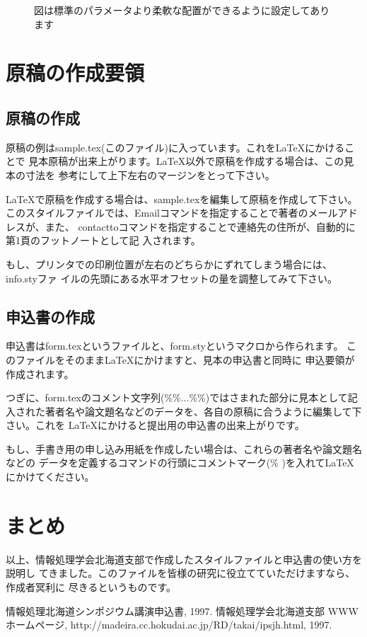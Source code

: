 \begin{figure}[h]
\vspace{6.5cm}
\caption{図は標準のパラメータより柔軟な配置ができるように設定してあります}
\label{f1}
\end{figure}

\section{原稿の作成要領}

\subsection{原稿の作成}
原稿の例はsample.tex(このファイル)に入っています。これを\LaTeX にかけることで
見本原稿が出来上がります。\LaTeX 以外で原稿を作成する場合は、この見本の寸法を
参考にして上下左右のマージンをとって下さい。

\LaTeX で原稿を作成する場合は、sample.texを編集して原稿を作成して下さい。
このスタイルファイルでは、Emailコマンドを指定することで著者のメールアドレスが、また、
contacttoコマンドを指定することで連絡先の住所が、自動的に第1頁のフットノートとして記
入されます。

もし、プリンタでの印刷位置が左右のどちらかにずれてしまう場合には、info.styファ
イルの先頭にある水平オフセットの量を調整してみて下さい。

\subsection{申込書の作成}
申込書はform.texというファイルと、form.styというマクロから作られます。
このファイルをそのまま\LaTeX にかけますと、見本の申込書と同時に
申込要領が作成されます。

つぎに、form.texのコメント文字列(\%\%$\ldots$\%\%)ではさまれた部分に見本として記
入された著者名や論文題名などのデータを、各自の原稿に合うように編集して下さい。これを
\LaTeX にかけると提出用の申込書の出来上がりです。

もし、手書き用の申し込み用紙を作成したい場合は、これらの著者名や論文題名などの
データを定義するコマンドの行頭にコメントマーク(\% )を入れて\LaTeX にかけてください。

\section{まとめ}
以上、情報処理学会北海道支部で作成したスタイルファイルと申込書の使い方を説明し
てきました。このファイルを皆様の研究に役立てていただけますなら、作成者冥利に
尽きるというものです。

\begin{thebibliography}{99}
 情報処理北海道シンポジウム講演申込書, 1997.
 情報処理学会北海道支部 WWWホームページ,
http://madeira.cc.hokudai.ac.jp/RD/takai/ipsjh.html, 1997.
\end{thebibliography}

%
%
